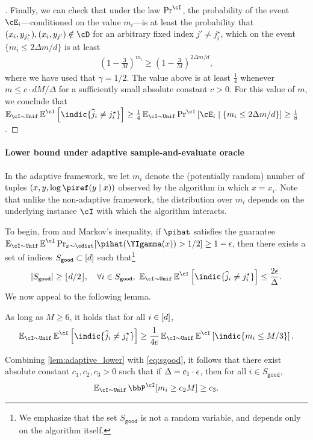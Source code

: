 \begin{proof}[]
  Finally, we can check that under the law $\Pnki$, the probability of
  the event $\cE_i$---conditioned on the value $m_i$---is at least the probability that
  $(x_i,y_{j^{\star}_i}),(x_i,y_{j'}) \notin \cD$ for an arbitrary
  fixed index $j' \ne j^{\star}_i$,
  which on the event $\{m_i \le 2\Delta{}m/d\}$ is at least
  \begin{align}
    \left(1 - \frac{3}{M}\right)^{m_i} \ge \left(1 - \frac{3}{M}\right)^{2\Delta m/d},
  \end{align}
  where we have used that $\gamma=1/2$.
  The value above is at least $\frac{1}{4}$ whenever $m \le c\cdot{}
  dM/\Delta$ for a sufficiently small
  absolute constant $c> 0$. For this value of $m$, we conclude that
  $\EnI\Enki\left[ \indic\{\wh{j}_i \ne j_i^\star\}\right] \ge
  \frac{1}{4} \EnI\Pnki \left[\cE_i \mid \{m_i \le 2\Delta
    m/d\}\right] \ge \frac{1}{8}$.
\end{proof}

\paragraph{Lower bound under adaptive sample-and-evaluate oracle}
\newcommand{\Sgood}{S_{\texttt{good}}}

In the adaptive framework, we let $m_i$ denote the (potentially
random) number of tuples $(x,y,\log\piref(y\mid{}x))$ observed by the algorithm in which $x
= x_{i}$.  Note that unlike the non-adaptive framework, the
distribution over $m_i$ depends on the
underlying instance $\cI$ with which the algorithm interacts.


To begin, from  and Markov's
inequality, if $\pihat$ satisfies the guarantee $
\EnI\Enki\Pr_{x \sim \cdist}[\pihat(\YIgamma(x)) > 1/2] \ge 1 -
\epsilon$, then there exists a set of indices $\Sgood\subset\brk{d}$
such that\footnote{We emphasize that the set $\Sgood$ is not a random
  variable, and depends only on
  the algorithm itself.}\loose
\begin{align}
  \label{eq:sgood}
    |\Sgood| \ge \floor{d/2}, \quad \forall i \in \Sgood, ~ \EnI\Enki\left[ \indic\{\wh{j}_i \ne j_i^\star\}\right] \le \frac{2\epsilon}{\Delta}.
\end{align}
We now appeal to the following lemma.
\begin{lemma}
  \label{lem:adaptive_lower}
  As long as $M\geq{}6$, it holds that for all $i\in[d]$,
  \begin{align}
    \EnI\Enki\left[ \indic\{\wh{j}_i \ne j_i^\star\}\right]
    \geq{} \frac{1}{4e}    \EnI\Enki\left[ \indic\{m_i\leq{}M/3\}\right].
  \end{align}
\end{lemma}
Combining \cref{lem:adaptive_lower} with \cref{eq:sgood}, it follows
that there exist absolute constant $c_1,c_2,c_3>0$ such that if
  $\Delta=c_1\cdot{}\epsilon$, then for all $i\in\Sgood$, 
  \begin{align}
    \EnI\bbP^{\cI}\brk*{m_i\geq{}c_2M} \geq{}c_3.
  \end{align}

